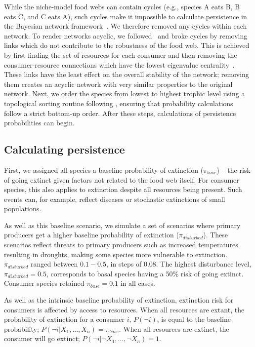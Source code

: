 \documentclass[12pt]{article}
\begin{document}
\begin{spacing}{2.0}
		While the niche-model food webs can contain cycles (e.g., species A eats B, B eats C, and C eats A), such cycles make it impossible to calculate persistence in the Bayesian network framework~\citep{Tarjan1972}. We therefore removed any cycles within each network.
		To render networks acyclic, we followed~\citet{Allesina2009} and broke cycles by removing links which do not contribute to the robustness of the food web.
		This is achieved by first finding the set of resources for each consumer and then removing the consumer-resource connections which have the lowest eigenvalue centrality~\citep{Allesina2009}.
		These links have the least effect on the overall stability of the network; removing them creates an acyclic network with very similar properties to the original network.
		Next, we order the species from lowest to highest trophic level using a topological sorting routine following \citep{Tarjan1972, Allesinaetal2005}, ensuring that probability calculations follow a strict bottom-up order. 
        After these steps, calculations of persistence probabilities can begin.

	\subsection*{Calculating persistence}	

		First, we assigned all species a baseline probability of extinction ($\pi_{base}$) -- the risk of going extinct given factors not related to the food web itself. 
		For consumer species, this also applies to extinction despite all resources being present. 
		Such events can, for example, reflect diseases or stochastic extinctions of small populations. 


		As well as this baseline scenario, we simulate a set of scenarios where primary producers get a higher baseline probability of extinction ($\pi_{disturbed}$). 
		These scenarios reflect threats to primary producers such as increased temperatures resulting in droughts, making some species more vulnerable to extinction.
		$\pi_{disturbed}$ ranged between $0.1-0.5$, in steps of $0.08$. The highest disturbance level, $\pi_{disturbed} = 0.5$, corresponds to basal species having a 50\% risk of going extinct. 
		Consumer species retained $\pi_{base}=0.1$ in all cases.
		
		
		As well as the intrinsic baseline probability of extinction, extinction risk for consumers is affected by access to resources. 
		When all resources are extant, the probability of extinction for a consumer $i$, $P(\lnot i)$, is equal to the baseline probability; $P(\lnot i|X_{1},...,X_{n}) = \pi_{base}$. 
		When all resources are extinct, the consumer will go extinct; $P(\lnot i|\lnot X_{1},...,\lnot X_{n})=1$. 


\end{spacing}
\end{document}
